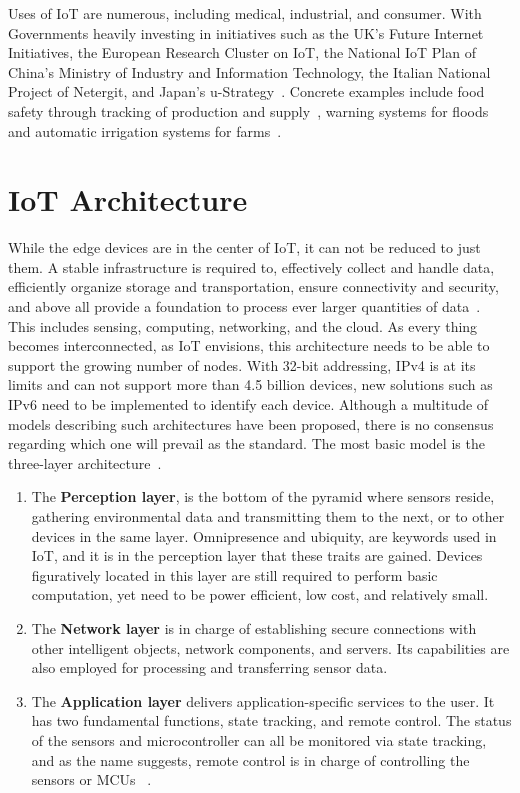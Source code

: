 Uses of IoT are numerous, including medical, industrial, and consumer. With Governments heavily investing in initiatives such as the UK's Future Internet Initiatives, the European Research Cluster on IoT, the National IoT Plan of China's Ministry of Industry and Information Technology, the Italian National Project of Netergit, and Japan's u-Strategy~\cite{shin2014socio}.
%
Concrete examples include food safety through tracking of production and supply~\cite{han2015design}, warning systems for floods~\cite{fang2015integrated} and automatic irrigation systems for farms~\cite{tarange2015web}.



\section{IoT Architecture} \label{iotarch.ch}
While the edge devices are in the center of IoT, it can not be reduced to just them. A stable infrastructure is required to, effectively collect and handle data, efficiently organize storage and transportation, ensure connectivity and security, and above all provide a foundation to process ever larger quantities of data~\cite{krishnamoorthy2021systematic}. This includes sensing, computing, networking, and the cloud. As every thing becomes interconnected, as IoT envisions, this architecture needs to be able to support the growing number of nodes. With 32-bit addressing, IPv4 is at its limits and can not support more than 4.5 billion devices, new solutions such as IPv6 need to be implemented to identify each device. Although a multitude of models describing such architectures have been proposed, there is no consensus regarding which one will prevail as the standard. The most basic model is the three-layer architecture~\cite{sethi2017internet}. 

\begin{enumerate}
\item The \textbf{Perception layer}, is the bottom of the pyramid where sensors reside, gathering environmental data and transmitting them to the next, or to other devices in the same layer. Omnipresence and ubiquity, are keywords used in IoT, and it is in the perception layer that these traits are gained. Devices figuratively located in this layer are still required to perform basic computation, yet need to be power efficient, low cost, and relatively small. 

\item The \textbf{Network layer} is in charge of establishing secure connections with other intelligent objects, network components, and servers. Its capabilities are also employed for processing and transferring sensor data.

\item The \textbf{Application layer} delivers application-specific services to the user. It has two fundamental functions, state tracking, and remote control. The status of the sensors and microcontroller can all be monitored via state tracking,  and as the name suggests, remote control is in charge of controlling the sensors or MCUs ~\cite{wu2020smart}.
\end{enumerate}

